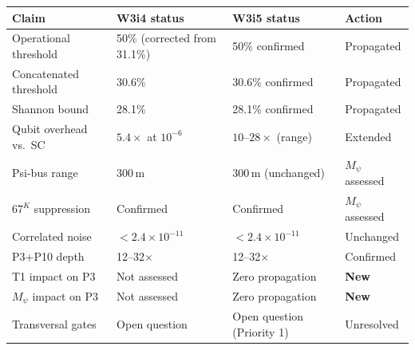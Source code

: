 \documentclass[11pt]{article}
\theoremstyle{definition}
\theoremstyle{remark}
\begin{document}
\begin{center}
\begin{tabular}{llll}
\toprule
Claim & W3i4 status & W3i5 status & Action \\
\midrule
Operational threshold & 50\% (corrected from 31.1\%) & 50\% confirmed & Propagated \\
Concatenated threshold & 30.6\% & 30.6\% confirmed & Propagated \\
Shannon bound & 28.1\% & 28.1\% confirmed & Propagated \\
Qubit overhead vs.\ SC & $5.4\times$ at $10^{-6}$ & $10\text{--}28\times$ (range) & Extended \\
Psi-bus range & 300\,m & 300\,m (unchanged) & $M_\psi$ assessed \\
$67^K$ suppression & Confirmed & Confirmed & $M_\psi$ assessed \\
Correlated noise & $< 2.4\times10^{-11}$ & $< 2.4\times10^{-11}$ & Unchanged \\
P3+P10 depth & 12--32$\times$ & 12--32$\times$ & Confirmed \\
T1 impact on P3 & Not assessed & Zero propagation & \textbf{New} \\
$M_\psi$ impact on P3 & Not assessed & Zero propagation & \textbf{New} \\
Transversal gates & Open question & Open question (Priority 1) & Unresolved \\
\bottomrule
\end{tabular}
\end{center}
\end{document}
